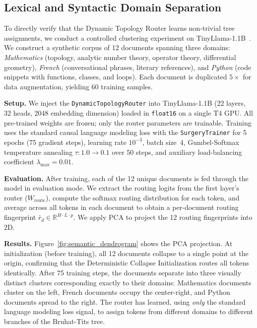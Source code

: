 \documentclass[11pt,a4paper]{article}
\begin{document}
\subsection{Lexical and Syntactic Domain Separation}
\label{sec:clustering}

To directly verify that the Dynamic Topology Router learns non-trivial tree assignments, we conduct a controlled clustering experiment on TinyLlama-1.1B~\citep{zhang2024tinyllama}. We construct a synthetic corpus of 12 documents spanning three domains: \emph{Mathematics} (topology, analytic number theory, operator theory, differential geometry), \emph{French} (conversational phrases, literary references), and \emph{Python} (code snippets with functions, classes, and loops). Each document is duplicated $5\times$ for data augmentation, yielding 60 training samples.

\textbf{Setup.} We inject the \texttt{DynamicTopologyRouter} into TinyLlama-1.1B (22 layers, 32 heads, 2048 embedding dimension) loaded in \texttt{float16} on a single T4 GPU. All pre-trained weights are frozen; only the router parameters are trainable. Training uses the standard causal language modeling loss with the \texttt{SurgeryTrainer} for 5 epochs (75 gradient steps), learning rate $10^{-3}$, batch size~4, Gumbel-Softmax temperature annealing $\tau: 1.0 \to 0.1$ over 50 steps, and auxiliary load-balancing coefficient $\lambda_{\max} = 0.01$.

\textbf{Evaluation.} After training, each of the 12 unique documents is fed through the model in evaluation mode. We extract the routing logits from the first layer's router ($W_{\text{route}}$), compute the softmax routing distribution for each token, and average across all tokens in each document to obtain a per-document routing fingerprint $\bar{r}_d \in \mathbb{R}^{H \cdot L \cdot p}$. We apply PCA to project the 12 routing fingerprints into 2D.

\textbf{Results.} Figure~\ref{fig:semantic_dendrogram} shows the PCA projection. At initialization (before training), all 12 documents collapse to a single point at the origin, confirming that the Deterministic Collapse Initialization routes all tokens identically. After 75 training steps, the documents separate into three visually distinct clusters corresponding exactly to their domains: Mathematics documents cluster on the left, French documents occupy the center-right, and Python documents spread to the right. The router has learned, using \emph{only} the standard language modeling loss signal, to assign tokens from different domains to different branches of the Bruhat-Tits tree.
\end{document}
